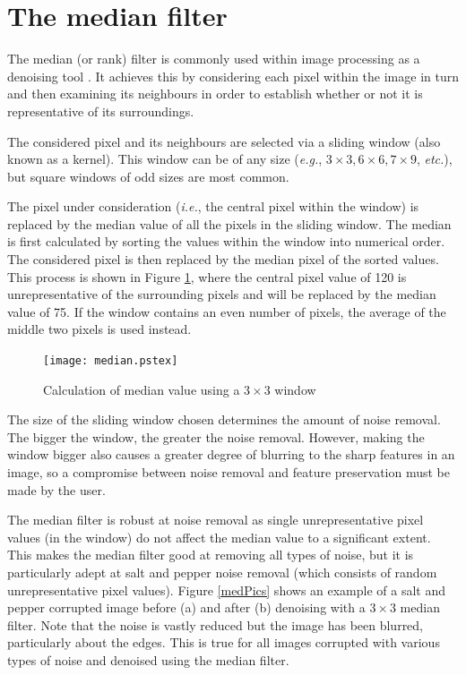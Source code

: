 \documentclass[12pt]{report}
\begin{document}
\section{The median filter}
\label{sec:medianFilt}
The median (or rank) filter is commonly used within image processing as a denoising tool \cite{pratt}.
It achieves this by considering each pixel within the image in turn and then examining
its neighbours in order to establish whether or not it is representative of its
surroundings.

The considered pixel and its neighbours are selected via a sliding
window (also known as a kernel). This window can be of any size (\emph{e.g.},
$3 \times 3, 6 \times 6, 7 \times 9$, \emph{etc.}), but square
windows of odd sizes are most common.

The pixel under consideration (\emph{i.e.}, the central pixel within the window) is replaced 
by the median value
of all the pixels in the sliding window. The median 
is first calculated by sorting the values 
within the window into numerical order. The considered pixel is then 
replaced by the median pixel of the sorted values.
This process is shown in Figure \ref{medianFig}, where
the central pixel value of 120 is unrepresentative of the
surrounding pixels and will be replaced by the median value of 75.
If the window contains an even number of pixels, the average of the
middle two pixels is used instead.

\begin{figure}[htb]
\setlength{\abovecaptionskip}{-0.2cm}
	\begin{center}
		\texttt{[image: median.pstex]}
	\end{center}
	\caption{Calculation of median value using a $3 \times 3$ window}
	\label{medianFig}
\end{figure}

The size of the sliding window chosen determines the amount of noise
removal. The bigger the window, the greater the noise removal. However,
making the window bigger also causes a greater degree of blurring to the
sharp features in an image, so a compromise between noise removal
and feature preservation must be made by the user.

The median filter is robust at noise removal as single unrepresentative
pixel values (in the window) do not affect the median value to a 
significant extent. This makes the median filter good at removing all
types of noise, but it is particularly adept at salt and pepper noise
removal (which consists of random unrepresentative pixel values).
Figure \ref{medPics} shows an example of a salt and pepper corrupted
image before (a) and after (b) denoising with a $3 \times 3$ median filter.
Note that the noise is vastly reduced but the image has been blurred,
particularly about the edges. This is true for all images corrupted
with various types of noise and denoised using the median filter.
\end{document}
